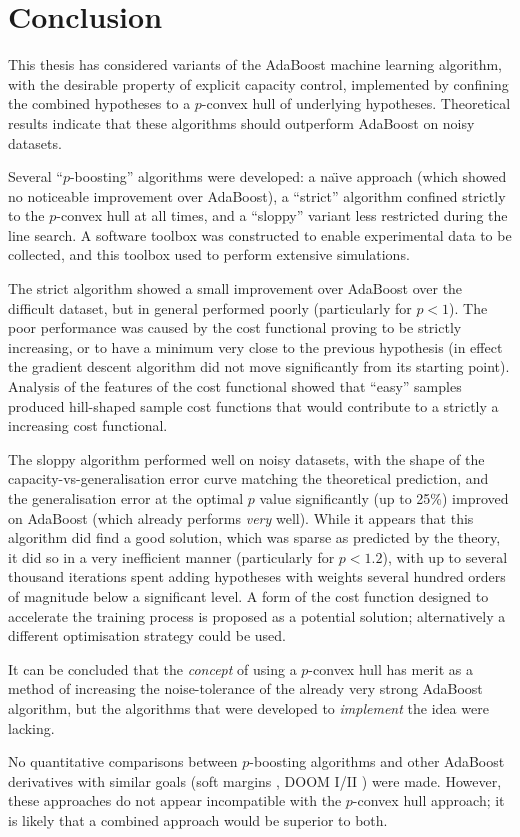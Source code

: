 
\chapter{Conclusion}
\label{chapter:conclusion}

This thesis has considered variants of the AdaBoost machine learning
algorithm, with the desirable property of explicit capacity control,
implemented by confining the combined hypotheses to a $p$-convex hull
of underlying hypotheses.  Theoretical results indicate that these
algorithms should outperform AdaBoost on noisy datasets.

Several ``$p$-boosting'' algorithms were developed: a na\"{\i}ve
approach (which showed no noticeable improvement over AdaBoost), a
``strict'' algorithm confined strictly to the $p$-convex hull at all
times, and a ``sloppy'' variant less restricted during the line
search.  A software toolbox was constructed to enable experimental
data to be collected, and this toolbox used to perform extensive
simulations.

The strict algorithm showed a small improvement over AdaBoost over the
difficult  dataset, but in general performed poorly
(particularly for $p < 1$).  The poor performance was caused by the
cost functional proving to be strictly increasing, or to have a
minimum very close to the previous hypothesis (in effect the gradient
descent algorithm did not move significantly from its starting point).
Analysis of the features of the cost functional showed that ``easy''
samples produced hill-shaped sample cost functions that would
contribute to a strictly a increasing cost functional.

The sloppy algorithm performed well on noisy datasets, with the shape
of the capacity-vs-gener\-alis\-ation error curve matching the theoretical
prediction, and the generalisation error at the optimal
$p$ value significantly (up to 25\%) improved on AdaBoost (which
already performs \emph{very} well).  While it appears that this
algorithm did find a good solution, which was sparse as predicted by
the theory, it did so in a very inefficient manner (particularly for
$p < 1.2$), with up to several thousand iterations spent adding
hypotheses with weights several hundred orders of magnitude below a
significant level.  A form of the cost function designed to
accelerate the training process is proposed as a potential solution;
alternatively a different optimisation strategy could be used.

It can be concluded that the \emph{concept} of using a $p$-convex hull
has merit as a method of increasing the noise-tolerance of the already
very strong AdaBoost algorithm, but the algorithms that were developed
to \emph{implement} the idea were lacking.

No quantitative comparisons between $p$-boosting algorithms and
other AdaBoost derivatives with similar goals (soft margins
\cite{Ratsch98}, DOOM I/II \cite{Mason99, Mason99a}) were made.
However, these approaches do not appear incompatible with the $p$-convex
hull approach; it is likely that a combined approach would be superior
to both.

